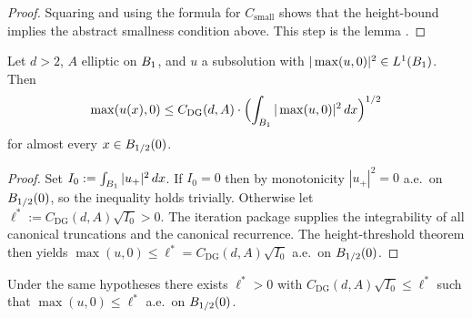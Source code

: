 \begin{proof}
\leanok
{}

Squaring and using the formula for $C_{\mathrm{small}}$ shows that
the height-bound implies the abstract smallness condition above.
This step is the lemma
.
\end{proof}

\begin{theorem}
\label{thm:linfty_subsolution_DeGiorgi}
\leanok
{}
Let $d > 2$, $A$ elliptic on $B_{1}$, and $u$ a subsolution with
$|\max(u,0)|^2 \in L^1(B_{1})$. Then
\begin{equation*}
  \max(u(x), 0) \le C_{\mathrm{DG}}(d, A) \cdot
    \Bigl(\int_{B_{1}} |\max(u,0)|^2\, dx\Bigr)^{1/2}
\end{equation*}
for almost every $x \in B_{1/2}(0)$.
\end{theorem}

\begin{proof}
\leanok
{}

Set $I_0 := \int_{B_{1}} |u_+|^2 \, dx$. If $I_0 = 0$ then by
monotonicity $|u_+|^2 = 0$ a.e.\ on $B_{1/2}(0)$, so the
inequality holds trivially. Otherwise let $\ell^* := C_{\mathrm{DG}}
(d,A) \sqrt{I_0} > 0$. The iteration package supplies the integrability
of all canonical truncations and the canonical recurrence. The
height-threshold theorem then yields $\max(u,0) \le \ell^* =
C_{\mathrm{DG}}(d,A) \sqrt{I_0}$ a.e.\ on $B_{1/2}(0)$.
\end{proof}

\begin{corollary}
\label{cor:linfty_subsolution_DeGiorgi_exists_threshold}
\leanok
{}
Under the same hypotheses there exists $\ell^* > 0$ with
$C_{\mathrm{DG}}(d,A) \sqrt{I_0} \le \ell^*$ such that
$\max(u,0) \le \ell^*$ a.e.\ on $B_{1/2}(0)$.
\end{corollary}

